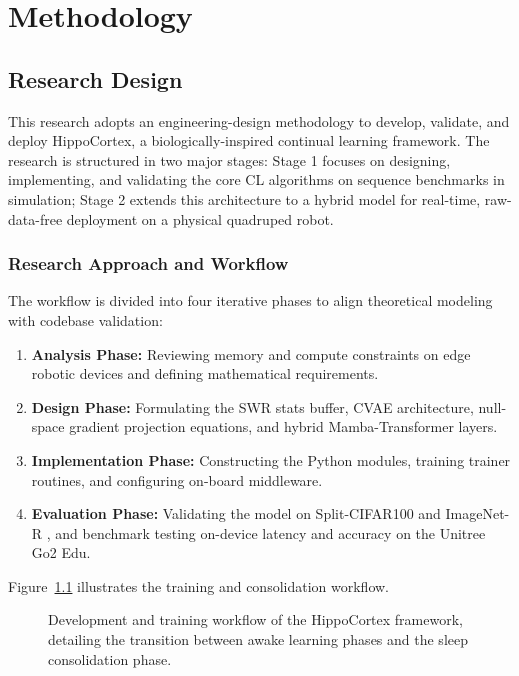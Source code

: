 

\chapter{Methodology}
\label{chap:methodology}

\section{Research Design}
\label{sec:research_design}

This research adopts an engineering-design methodology to develop, validate, and deploy HippoCortex, a biologically-inspired continual learning framework. The research is structured in two major stages: Stage 1 focuses on designing, implementing, and validating the core CL algorithms on sequence benchmarks in simulation; Stage 2 extends this architecture to a hybrid model for real-time, raw-data-free deployment on a physical quadruped robot.

\subsection{Research Approach and Workflow}
The workflow is divided into four iterative phases to align theoretical modeling with codebase validation:
\begin{enumerate}
    \item \textbf{Analysis Phase:} Reviewing memory and compute constraints on edge robotic devices and defining mathematical requirements.
    \item \textbf{Design Phase:} Formulating the SWR stats buffer, CVAE architecture, null-space gradient projection equations, and hybrid Mamba-Transformer layers.
    \item \textbf{Implementation Phase:} Constructing the Python modules, training trainer routines, and configuring on-board middleware.
    \item \textbf{Evaluation Phase:} Validating the model on Split-CIFAR100 and ImageNet-R \cite{hendrycksManyFacesRobustness2021}, and benchmark testing on-device latency and accuracy on the Unitree Go2 Edu.
\end{enumerate}

Figure~\ref{fig:development_workflow} illustrates the training and consolidation workflow.

\begin{figure}[ht]
    \centering
    
    \caption{Development and training workflow of the HippoCortex framework, detailing the transition between awake learning phases and the sleep consolidation phase.}
    \label{fig:development_workflow}
\end{figure}

